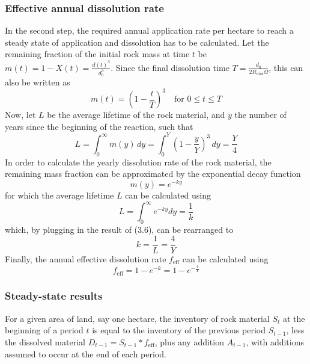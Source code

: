 \subsubsection{Effective annual dissolution rate}
In the second step, the required annual application rate per hectare to reach a steady state of application and dissolution has to be calculated.
Let the remaining fraction of the initial rock mass at time \(t\) be \(m(t) = 1 - X(t) = \frac{d(t)^3}{d_0^3}\). Since the final dissolution time \(T=\frac{d_0}{2R_{\text{diss}}\Omega}\), this can also be written as
\begin{equation}
  m(t) = \left(1 - \frac{t}{T}\right)^3
  \quad\text{for } 0 \le t \le T
\end{equation}
Now, let \(L\) be the average lifetime of the rock material, and \(y\) the number of years since the beginning of the reaction, such that\footnotemark[4]
\begin{equation}
  L = \int_0^{\infty}m(y)\,dy= \int_0^Y\left(1-\frac{y}{Y}\right)^3\,dy = \frac{Y}{4}
\end{equation}
In order to calculate the yearly dissolution rate of the rock material, the remaining mass fraction can be approximated by the exponential decay function
\begin{equation}
  m(y) = e^{-ky}
\end{equation}
for which the average lifetime \(L\) can be calculated using
\begin{equation}
  L = \int_0^\infty e^{-ky} dy = \frac{1}{k}
\end{equation}
which, by plugging in the result of (3.6), can be rearranged to
\begin{equation}
  k = \frac{1}{L} = \frac{4}{Y}
\end{equation}
Finally, the annual effective dissolution rate \(f_{\text{eff}}\) can be calculated using
\begin{equation}
  f_{\text{eff}} = 1-e^{-k}=1-e^{-\frac{4}{Y}}
\end{equation}
\subsubsection{Steady-state results}
For a given area of land, say one hectare, the inventory of rock material \(S_t\) at the beginning of a period \(t\) is equal to the inventory of the previous period \(S_{t-1}\), less the dissolved material \(D_{t-1} = S_{t-1}*f_{\text{eff}}\), plus any addition \(A_{t-1}\), with additions assumed to occur at the end of each period.\vspace{2mm}

